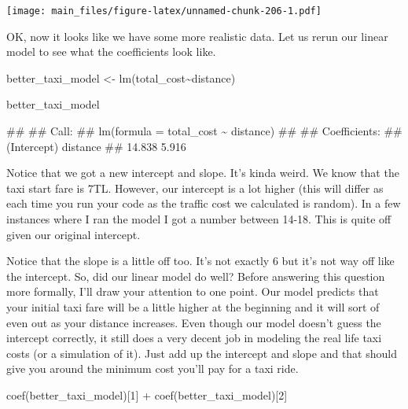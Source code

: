 \documentclass[
]{book}
\newenvironment{Shaded}{\begin{snugshade}}{\end{snugshade}}
\newcommand{\DecValTok}[1]{\textcolor[rgb]{0.00,0.00,0.81}{#1}}
\newcommand{\FunctionTok}[1]{\textcolor[rgb]{0.00,0.00,0.00}{#1}}
\newcommand{\NormalTok}[1]{#1}
\newcommand{\OtherTok}[1]{\textcolor[rgb]{0.56,0.35,0.01}{#1}}
\newcommand{\SpecialCharTok}[1]{\textcolor[rgb]{0.00,0.00,0.00}{#1}}
\begin{document}
\texttt{[image: main\_files/figure-latex/unnamed-chunk-206-1.pdf]}

OK, now it looks like we have some more realistic data. Let us rerun our linear model to see what the coefficients look like.

\begin{Shaded}
\begin{Highlighting}[]
\NormalTok{better\_taxi\_model }\OtherTok{\textless{}{-}} \FunctionTok{lm}\NormalTok{(total\_cost}\SpecialCharTok{\textasciitilde{}}\NormalTok{distance)}

\NormalTok{better\_taxi\_model}
\end{Highlighting}
\end{Shaded}

\begin{Shaded}
\begin{Highlighting}[]
\NormalTok{\#\# }
\NormalTok{\#\# Call:}
\NormalTok{\#\# lm(formula = total\_cost \textasciitilde{} distance)}
\NormalTok{\#\# }
\NormalTok{\#\# Coefficients:}
\NormalTok{\#\# (Intercept)     distance  }
\NormalTok{\#\#      14.838        5.916}
\end{Highlighting}
\end{Shaded}

Notice that we got a new intercept and slope. It's kinda weird. We know that the taxi start fare is 7TL. However, our intercept is a lot higher (this will differ as each time you run your code as the traffic cost we calculated is random). In a few instances where I ran the model I got a number between 14-18. This is quite off given our original intercept.

Notice that the slope is a little off too. It's not exactly 6 but it's not way off like the intercept. So, did our linear model do well? Before answering this question more formally, I'll draw your attention to one point. Our model predicts that your initial taxi fare will be a little higher at the beginning and it will sort of even out as your distance increases. Even though our model doesn't guess the intercept correctly, it still does a very decent job in modeling the real life taxi costs (or a simulation of it). Just add up the intercept and slope and that should give you around the minimum cost you'll pay for a taxi ride.

\begin{Shaded}
\begin{Highlighting}[]
\FunctionTok{coef}\NormalTok{(better\_taxi\_model)[}\DecValTok{1}\NormalTok{] }\SpecialCharTok{+} \FunctionTok{coef}\NormalTok{(better\_taxi\_model)[}\DecValTok{2}\NormalTok{]}
\end{Highlighting}
\end{Shaded}
\end{document}

